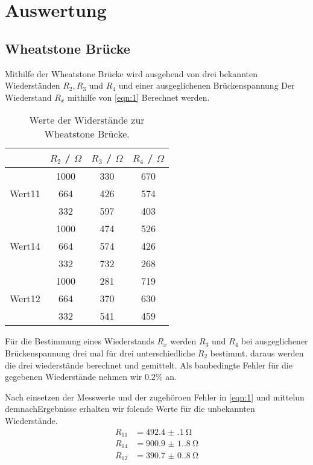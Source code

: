 \section{Auswertung}
\label{sec:Auswertung}

\subsection{Wheatstone Brücke}
Mithilfe der Wheatstone Brücke wird ausgehend von drei 
bekannten Wiederständen $R_2, R_3 $ und $R_4$ und einer ausgeglichenen Brückenspannung 
Der Wiederstand $R_x$ mithilfe von \autoref{eqn:1} Berechnet werden. 
\begin{table}[H]
    \centering
    \caption{Werte der Widerstände zur Wheatstone Brücke.}
    \label{tab:t1}
    \begin{tabular}{|l|c|c|c|}
        \hline
        & \textbf{$R_2$ / $\Omega$} & \textbf{$R_3$ / $\Omega$} & \textbf{$R_4$ / $\Omega$} \\
        \hline
        \hline
               & 1000 & 330 & 670 \\
        Wert11 & 664  & 426 & 574 \\
               & 332  & 597 & 403 \\
        \hline
        \hline
               & 1000 & 474 & 526 \\
        Wert14 & 664  & 574 & 426 \\
               & 332  & 732 & 268 \\
        \hline
        \hline
               & 1000 & 281 & 719 \\
        Wert12 & 664  & 370 & 630 \\
               & 332  & 541 & 459 \\
        \hline
    \end{tabular}
\end{table}
Für die Bestimmung eines Wiederstands $R_x$ werden $R_3$ und $R_4$ bei ausgeglichener Brückenspannung drei 
mal für drei unterschiedliche $R_2$ bestimmt. daraus werden die drei wiederstände berechnet und gemittelt.
Als baubedingte Fehler für die gegebenen Wiederstände nehmen wir $0.2\% $ an.

Nach einsetzen der Messwerte und der zugehöroen Fehler in \autoref{eqn:1} und mittelun demnachErgebnisse 
erhalten wir folende Werte für die unbekannten Wiederstände.
\begin{align}
       R_{11} &= \qty{492.4(1)}{\ohm}\\
       R_{14} &= \qty{900.9(1.8)}{\ohm}\\
       R_{12} &= \qty{390.7(0.8)}{\ohm}
\end{align}




